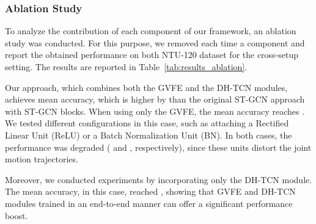 \documentclass{article}
\begin{document}
\begin{table}[ht!]
        \centering
        \caption{Accuracy of recognition (\%) using only  ST-GCN or AS-GCN blocks on NTU-120 dataset for cross-subject and cross-setup settings. *These values are not reported in the state-of-the-art. Thus, the available codes have been used to obtain these results.}
        \label{tab:results_4blocks}
    \end{table}
    


\subsubsection{Ablation Study}
\label{sec:ablation_study}
To analyze the contribution of each component of our framework, an ablation study was conducted. For this purpose, we removed each time a component and report the obtained performance on both NTU-120 dataset for the cross-setup setting. The results are reported in Table~\ref{tab:results_ablation}. 

Our approach, which combines both the GVFE and the DH-TCN modules, achieves  mean accuracy, which is higher by  than the original ST-GCN approach with  ST-GCN blocks. When using only the GVFE, the mean accuracy reaches . We tested different configurations in this case, such as attaching a Rectified Linear Unit (ReLU) or a Batch Normalization Unit (BN). In both cases, the performance was degraded ( and , respectively), since these units distort the joint motion trajectories. 

Moreover, we conducted experiments by incorporating only the DH-TCN module. The mean accuracy, in this case, reached , showing that GVFE and DH-TCN modules trained in an end-to-end manner can offer a significant performance boost.
\end{document}
